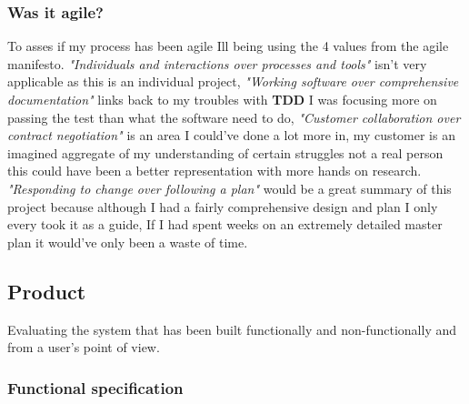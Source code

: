 \documentclass[12pt]{article}
\begin{document}
\subsubsection{Was it agile?}

To asses if my process has been agile Ill being using the 4 values from the agile manifesto\cite{agile}. \textit{"Individuals and interactions over processes and tools"} isn't very applicable as this is an individual project, \textit{"Working software over comprehensive documentation"} links back to my troubles with \textbf{TDD} I was focusing more on passing the test than what the software need to do, \textit{"Customer collaboration over contract negotiation"} is an area I could've done a lot more in, my customer is an imagined aggregate of my understanding of certain struggles not a real person this could have been a better representation with more hands on research. \textit{"Responding to change over following a plan"} would be a great summary of this project because although I had a fairly comprehensive design and plan I only every took it as a guide, If I had spent weeks on an extremely detailed master plan it would've only been a waste of time.

\subsection{Product}
Evaluating the system that has been built functionally and non-functionally and from a user's point of view.


\subsubsection{Functional specification}
\end{document}
